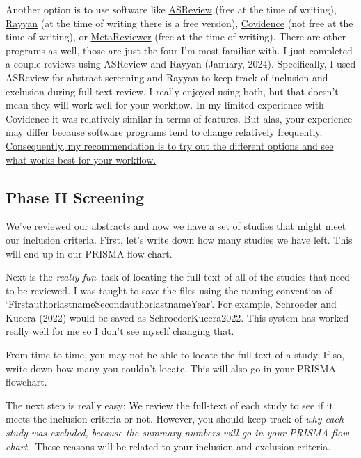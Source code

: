 \documentclass[
]{book}
\begin{document}
Another option is to use software like \href{https://asreview.nl/}{ASReview} (free at the time of writing), \href{https://www.rayyan.ai/}{Rayyan} (at the time of writing there is a free version), \href{https://www.covidence.org/}{Covidence} (not free at the time of writing), or \href{https://www.metareviewer.org/}{MetaReviewer} (free at the time of writing). There are other programs as well, those are just the four I'm most familiar with. I just completed a couple reviews using ASReview and Rayyan (January, 2024). Specifically, I used ASReview for abstract screening and Rayyan to keep track of inclusion and exclusion during full-text review. I really enjoyed using both, but that doesn't mean they will work well for your workflow. In my limited experience with Covidence it was relatively similar in terms of features. But alas, your experience may differ because software programs tend to change relatively frequently. \ul{Consequently, my recommendation is to try out the different options and see what works best for your workflow.}

\hypertarget{phase-ii-screening}{%
\subsection{Phase II Screening}\label{phase-ii-screening}}

We've reviewed our abstracts and now we have a set of studies that might meet our inclusion criteria. First, let's write down how many studies we have left. This will end up in our PRISMA flow chart.

Next is the \emph{really fun}~task of locating the full text of all of the studies that need to be reviewed. I was taught to save the files using the naming convention of `FirstauthorlastnameSecondauthorlastnameYear'. For example, Schroeder and Kucera (2022)\citep{schroeder2022} would be saved as SchroederKucera2022. This system has worked really well for me so I don't see myself changing that.

From time to time, you may not be able to locate the full text of a study. If so, write down how many you couldn't locate. This will also go in your PRISMA flowchart.

The next step is really easy: We review the full-text of each study to see if it meets the inclusion criteria or not. However, you should keep track of \emph{why each study was excluded, because the summary numbers will go in your PRISMA flow chart.}~These reasons will be related to your inclusion and exclusion criteria.
\end{document}

